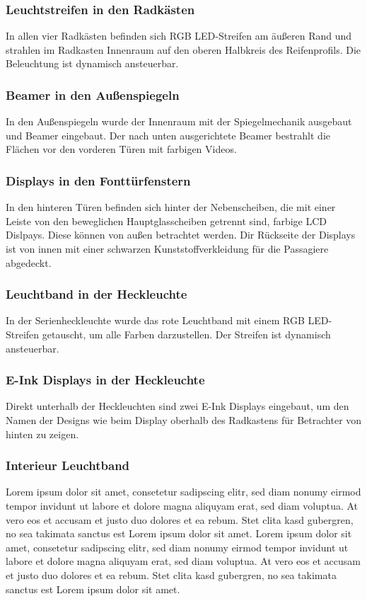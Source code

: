 \subsubsection{Leuchtstreifen in den Radkästen}
In allen vier Radkästen befinden sich RGB LED-Streifen am äußeren Rand und strahlen im Radkasten Innenraum auf den oberen Halbkreis des Reifenprofils. Die Beleuchtung ist dynamisch ansteuerbar.
\subsubsection{Beamer in den Außenspiegeln}
In den Außenspiegeln wurde der Innenraum mit der Spiegelmechanik ausgebaut und Beamer eingebaut. Der nach unten ausgerichtete Beamer bestrahlt die Flächen vor den vorderen Türen mit farbigen Videos.
\subsubsection{Displays in den Fonttürfenstern}
In den hinteren Türen befinden sich hinter der Nebenscheiben, die mit einer Leiste von den beweglichen Hauptglasscheiben getrennt sind, farbige LCD Dislpays. Diese können von außen betrachtet werden. Dir Rückseite der Displays ist von innen mit einer schwarzen Kunststoffverkleidung für die Passagiere abgedeckt.
\subsubsection{Leuchtband in der Heckleuchte}
In der Serienheckleuchte wurde das rote Leuchtband mit einem RGB LED-Streifen getauscht, um alle Farben darzustellen. Der Streifen ist dynamisch ansteuerbar.
\subsubsection{E-Ink Displays in der Heckleuchte}
Direkt unterhalb der Heckleuchten sind zwei E-Ink Displays eingebaut, um den Namen der Designs wie beim Display oberhalb des Radkastens für Betrachter von hinten zu zeigen.
\subsubsection{Interieur Leuchtband}
Lorem ipsum dolor sit amet, consetetur sadipscing elitr, sed diam nonumy eirmod tempor invidunt ut labore et dolore magna aliquyam erat, sed diam voluptua. At vero eos et accusam et justo duo dolores et ea rebum. Stet clita kasd gubergren, no sea takimata sanctus est Lorem ipsum dolor sit amet. Lorem ipsum dolor sit amet, consetetur sadipscing elitr, sed diam nonumy eirmod tempor invidunt ut labore et dolore magna aliquyam erat, sed diam voluptua. At vero eos et accusam et justo duo dolores et ea rebum. Stet clita kasd gubergren, no sea takimata sanctus est Lorem ipsum dolor sit amet.
